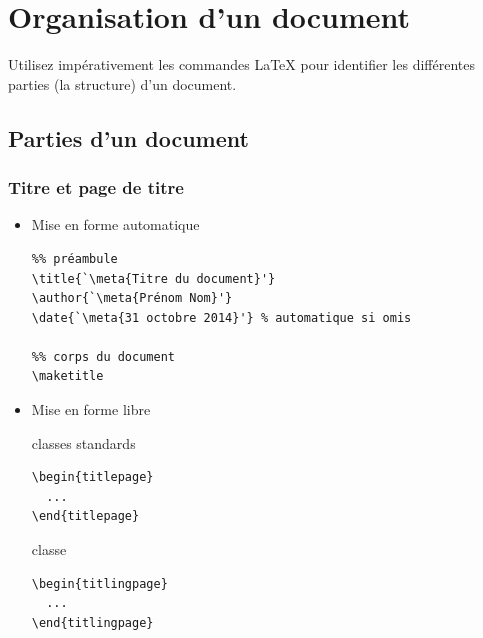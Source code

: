\section{Organisation d'un document}

\begin{conseil}
  Utilisez impérativement les commandes {\LaTeX} pour identifier les
  différentes parties (la structure) d'un document.
\end{conseil}

\subsection{Parties d'un document}

\begin{frame}[fragile]
  \frametitle{Titre et page de titre}
  \begin{itemize}
  \item Mise en forme automatique
    \begin{lstlisting}
%% préambule
\title{`\meta{Titre du document}'}
\author{`\meta{Prénom Nom}'}
\date{`\meta{31 octobre 2014}'} % automatique si omis

%% corps du document
\maketitle
    \end{lstlisting}
  \item Mise en forme libre \\[6pt]
    \begin{minipage}{0.45\linewidth}
      \begin{block}{\small classes standards}
\begin{lstlisting}
\begin{titlepage}
  ...
\end{titlepage}
\end{lstlisting}
      \end{block}
    \end{minipage}
    \hfill
    \begin{minipage}{0.45\linewidth}
      \begin{block}{\small classe }
\begin{lstlisting}
\begin{titlingpage}
  ...
\end{titlingpage}
\end{lstlisting}
      \end{block}
    \end{minipage}
  \end{itemize}
\end{frame}

